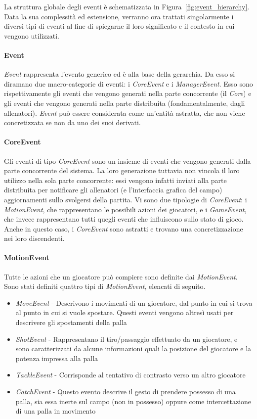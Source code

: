 La struttura globale degli eventi è schematizzata in Figura~\ref{fig:event_hierarchy}. Data la sua complessità ed estensione, verranno ora trattati singolarmente i diversi tipi di eventi al fine di spiegarne il loro significato e il contesto in cui vengono utilizzati.

\paragraph{Event} \textit{Event} rappresenta l'evento generico ed è alla base della gerarchia. Da esso si diramano due macro-categorie di eventi: i \textit{CoreEvent} e i \textit{ManagerEvent}. Esso sono rispettivamente gli eventi che vengono generati nella parte concorrente (il \emph{Core}) e gli eventi che vengono generati nella parte distribuita (fondamentalmente, dagli allenatori). \textit{Event} può essere considerata come un'entità astratta, che non viene concretizzata se non da uno dei suoi derivati.

\paragraph{CoreEvent} Gli eventi di tipo \textit{CoreEvent} sono un insieme di eventi che vengono generati dalla parte concorrente del sistema. La loro generazione tuttavia non vincola il loro utilizzo nella sola parte concorrente: essi vengono infatti inviati alla parte distribuita per notificare gli allenatori (e l'interfaccia grafica del campo) aggiornamenti sullo svolgersi della partita. Vi sono due tipologie di \textit{CoreEvent}: i \textit{MotionEvent}, che rappresentano le possibili azioni dei giocatori, e i \textit{GameEvent}, che invece rappresentano tutti quegli eventi che influiscono sullo stato di gioco. Anche in questo caso, i \textit{CoreEvent} sono astratti e trovano una concretizzazione nei loro discendenti.

\paragraph{MotionEvent} Tutte le azioni che un giocatore può compiere sono definite dai \textit{MotionEvent}. Sono stati definiti quattro tipi di \textit{MotionEvent}, elencati di seguito.

\begin{itemize}
	\item \textit{MoveEvent} - Descrivono i movimenti di un giocatore, dal punto in cui si trova al punto in cui si vuole spostare. Questi eventi vengono altresì usati per descrivere gli spostamenti della palla
	\item \textit{ShotEvent} - Rappresentano il tiro/passaggio effettuato da un giocatore, e sono caratterizzati da alcune informazioni quali la posizione del giocatore e la potenza impressa alla palla
	\item \textit{TackleEvent} - Corrisponde al tentativo di contrasto verso un altro giocatore
	\item \textit{CatchEvent} - Questo evento descrive il gesto di prendere possesso di una palla, sia essa inerte sul campo (non in possesso) oppure come intercettazione di una palla in movimento
\end{itemize}

